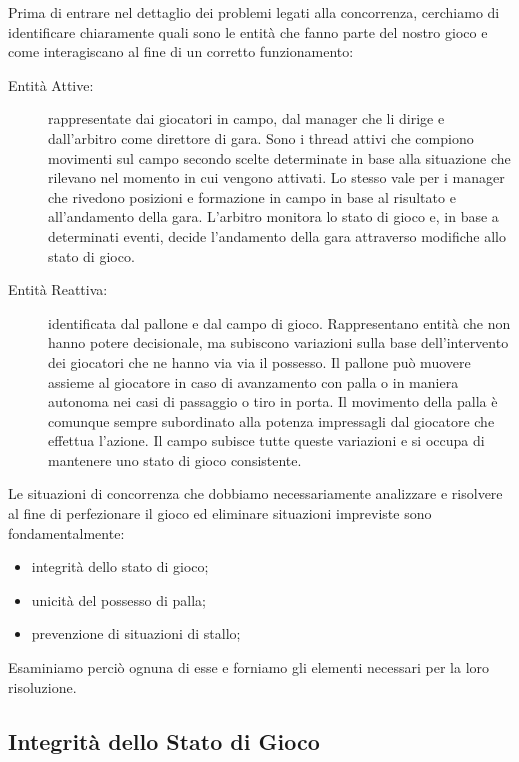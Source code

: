 \documentclass[aps,letterpaper,10pt]{article}
\begin{document}
Prima di entrare nel dettaglio dei problemi legati alla concorrenza, cerchiamo di identificare chiaramente quali sono le entit\`a che fanno parte del nostro gioco e come interagiscano al fine di un corretto funzionamento:

\begin{description}
	\item[Entit\`a Attive:] rappresentate dai giocatori in campo, dal manager che li dirige e dall'arbitro come direttore di gara. Sono i thread attivi che compiono movimenti sul campo secondo scelte determinate in base alla situazione che rilevano nel momento in cui vengono attivati. Lo stesso vale per i manager che rivedono posizioni e formazione in campo in base al risultato e all'andamento della gara. L'arbitro monitora lo stato di gioco e, in base a determinati eventi, decide l'andamento della gara attraverso modifiche allo stato di gioco.
	\item[Entit\`a Reattiva:] identificata dal pallone e dal campo di gioco. Rappresentano entit\`a che non hanno potere decisionale, ma subiscono variazioni sulla base dell'intervento dei giocatori che ne hanno via via il possesso. Il pallone pu\`o muovere assieme al giocatore in caso di avanzamento con palla o in maniera autonoma nei casi di passaggio o tiro in porta. Il movimento della palla \`e comunque sempre subordinato alla potenza impressagli dal giocatore che effettua l'azione. Il campo subisce tutte queste variazioni e si occupa di mantenere uno stato di gioco consistente.
\end{description}

Le situazioni di concorrenza che dobbiamo necessariamente analizzare e risolvere al fine di perfezionare il gioco ed eliminare situazioni impreviste sono fondamentalmente:

\begin{itemize}
	\item integrit\`a dello stato di gioco;
	\item unicit\`a del possesso di palla;
	\item prevenzione di situazioni di stallo;
\end{itemize}

Esaminiamo perci\`o ognuna di esse e forniamo gli elementi necessari per la loro risoluzione.

\subsection{Integrit\`a dello Stato di Gioco}
\label{statodigioco}
\end{document}
